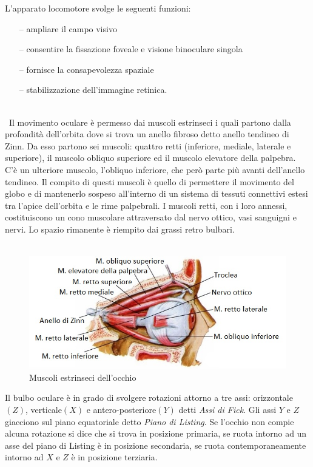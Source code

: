 L’apparato locomotore svolge le seguenti funzioni:
 \begin{itemize}
 \itemsep-0.5em 
 \item[--]ampliare il campo visivo
 \item[--]consentire la fissazione foveale e visione binoculare singola
 \item[--]fornisce la consapevolezza spaziale
 \item[--]stabilizzazione dell’immagine retinica.
 \end{itemize}
\\\
Il movimento oculare è permesso dai muscoli estrinseci i quali partono dalla profondità dell’orbita dove si trova un anello fibroso detto anello tendineo di Zinn. Da esso partono sei muscoli: quattro retti (inferiore, mediale, laterale e superiore), il muscolo obliquo superiore ed il muscolo elevatore della palpebra. C’è un ulteriore muscolo, l’obliquo inferiore, che però parte più avanti dell’anello tendineo. Il compito di questi muscoli è quello di permettere il movimento del globo e di mantenerlo sospeso all’interno di un sistema di tessuti connettivi estesi tra l’apice dell’orbita e le rime palpebrali. I muscoli retti, con i loro annessi, costituiscono un cono muscolare attraversato dal nervo ottico, vasi sanguigni e nervi. Lo spazio rimanente è riempito dai grassi retro bulbari. 
\\\
\begin{figure}[h!]
	\centering
	\includegraphics[scale=2.5]{source/immagini/muscoli_estrinseci_occhio.jpg}
	\caption[figure]{Muscoli estrinseci dell'occhio}
	\label{fig:issuexample}
\end{figure}

Il bulbo oculare è in grado di svolgere rotazioni attorno a tre assi: orizzontale$(Z)$, verticale$(X)$ e antero-posteriore$(Y)$ detti \emph{Assi di Fick}. Gli assi $Y$ e $Z$ giacciono sul piano equatoriale detto \emph{Piano di Listing}. Se l’occhio non compie alcuna rotazione si dice che si trova in posizione primaria, se ruota intorno ad un asse del piano di Listing  è in posizione secondaria, se ruota contemporaneamente intorno ad $X$ e $Z$ è in posizione terziaria.

